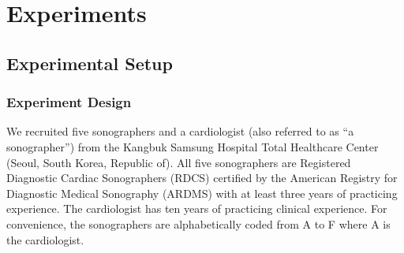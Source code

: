 

%

\section{Experiments}\label{section:eval}
\subsection{Experimental Setup}
\subsubsection{Experiment Design}
We recruited five sonographers and a cardiologist (also referred to as ``a sonographer'') from the Kangbuk Samsung Hospital Total Healthcare Center (Seoul, South Korea, Republic of).
All five sonographers are Registered Diagnostic Cardiac Sonographers (RDCS) certified by the American Registry for Diagnostic Medical Sonography (ARDMS) with at least three years of practicing experience.
The cardiologist has ten years of practicing clinical experience.
For convenience, the sonographers are alphabetically coded from A to F where A is the cardiologist.

